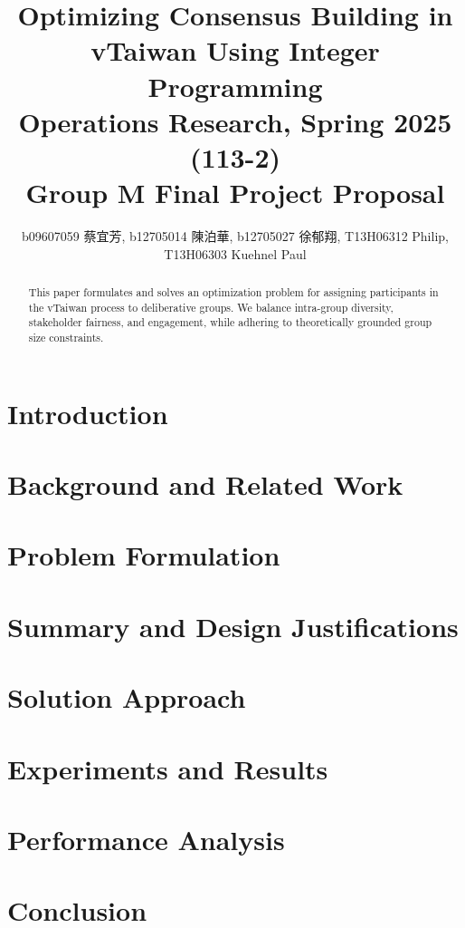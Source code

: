 \documentclass[11pt,a4paper]{article}
\title{Optimizing Consensus Building in vTaiwan Using Integer Programming \\
\large Operations Research, Spring 2025 (113-2) \\ Group M Final Project Proposal}
\author{b09607059 {\chinesefont 蔡宜芳}, b12705014 {\chinesefont 陳泊華},
    b12705027 {\chinesefont 徐郁翔}, T13H06312 Philip, T13H06303 Kuehnel Paul}
\affil{Department of Information Management, National Taiwan University}
\begin{document}
\maketitle


\begin{abstract}

\centering
This paper formulates and solves an optimization problem for assigning participants
in the vTaiwan process to deliberative groups.
We balance intra-group diversity, stakeholder fairness, and engagement,
while adhering to theoretically grounded group size constraints.

\end{abstract}

\newpage

\section{Introduction}\label{sec:intro}


\section{Background and Related Work}\label{sec:background}


\section{Problem Formulation}\label{sec:problem_formulation}


\section{Summary and Design Justifications}\label{sec:design}


\section{Solution Approach}\label{sec:solution}


\section{Experiments and Results}\label{sec:experiments}


\section{Performance Analysis}\label{sec:performance}


\section{Conclusion}\label{sec:conclusion}

\end{document}
